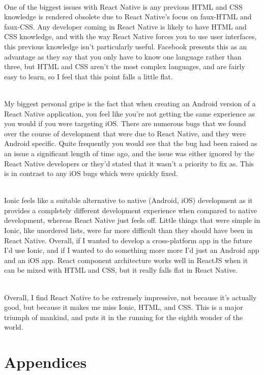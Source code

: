 \documentclass[a4paper, 11pt]{article}
\begin{document}
~\\
One of the biggest issues with React Native is any previous HTML and CSS knowledge is rendered obsolete due to React Native's focus on faux-HTML and faux-CSS. Any developer coming in React Native is likely to have HTML and CSS knowledge, and with the way React Native forces you to use user interfaces, this previous knowledge isn't particularly useful. Facebook presents this as an advantage as they say that you only have to know one language rather than three, but HTML and CSS aren't the most complex languages, and are fairly easy to learn, so I feel that this point falls a little flat.

~\\
My biggest personal gripe is the fact that when creating an Android version of a React Native application, you feel like you're not getting the same experience as you would if you were targeting iOS. There are numerous bugs that we found over the course of development that were due to React Native, and they were Android specific. Quite frequently you would see that the bug had been raised as an issue a significant length of time ago, and the issue was either ignored by the React Native developers or they'd stated that it wasn't a priority to fix as. This is in contrast to any iOS bugs which were quickly fixed.

~\\
Ionic feels like a suitable alternative to native (Android, iOS) development as it provides a completely different development experience when compared to native development, whereas React Native just feels off. Little things that were simple in Ionic, like unordered lists, were far more difficult than they should have been in React Native. Overall, if I wanted to develop a cross-platform app in the future I'd use Ionic, and if I wanted to do something more more I'd just an Android app and an iOS app. React component architecture works well in ReactJS when it can be mixed with HTML and CSS, but it really falls flat in React Native.

~\\
Overall, I find React Native to be extremely impressive, not because it's actually good, but because it makes me miss Ionic, HTML, and CSS. This is a major triumph of mankind, and puts it in the running for the eighth wonder of the world.

\section{Appendices}
\end{document}
